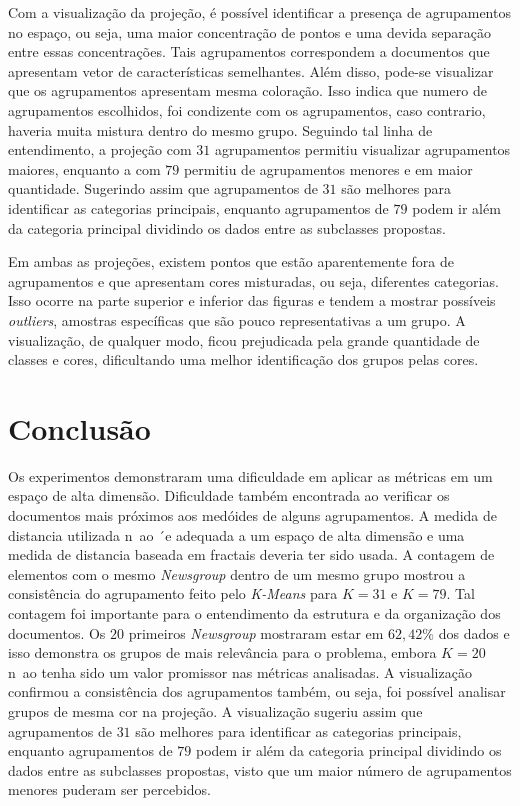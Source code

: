 \documentclass[conference]{IEEEtran}
\begin{document}
Com a visualização da projeção, é possível identificar a presença de agrupamentos no espaço, ou seja, uma maior concentração de pontos e uma devida separação entre essas concentrações. Tais agrupamentos correspondem a documentos que apresentam vetor de características semelhantes. Além disso, pode-se visualizar que os agrupamentos apresentam mesma coloração. Isso indica que numero de agrupamentos escolhidos, foi condizente com os agrupamentos, caso contrario, haveria muita mistura dentro do mesmo grupo. Seguindo tal linha de entendimento, a projeção com $31$ agrupamentos permitiu visualizar agrupamentos maiores, enquanto a com $79$ permitiu de agrupamentos menores e em maior quantidade. Sugerindo assim que agrupamentos de $31$ são melhores para identificar as categorias principais, enquanto agrupamentos de $79$ podem ir além da categoria principal dividindo os dados entre as subclasses propostas.

Em ambas as projeções, existem pontos que estão aparentemente fora de agrupamentos e que apresentam cores misturadas, ou seja, diferentes categorias. Isso ocorre na parte superior e inferior das figuras e tendem a mostrar possíveis \emph{outliers}, amostras específicas que são pouco representativas a um grupo. A visualização, de qualquer modo, ficou prejudicada pela grande quantidade de classes e cores, dificultando uma melhor identificação dos grupos pelas cores.

\section{Conclusão}

Os experimentos demonstraram uma dificuldade em aplicar as métricas em um espaço de alta dimensão. Dificuldade também encontrada ao verificar os documentos mais próximos aos medóides de alguns agrupamentos. A medida de distancia utilizada n~ao ´e adequada a um espaço de alta dimensão e uma medida de distancia baseada em fractais deveria ter sido usada\cite{b1}. A contagem de elementos com o mesmo \emph{Newsgroup} dentro de um mesmo grupo mostrou a consistência do agrupamento feito pelo \emph{K-Means} para $K=31$ e $K=79$. Tal contagem foi importante para o entendimento da estrutura e da organização dos documentos. Os $20$ primeiros \emph{Newsgroup} mostraram estar em $62,42\%$ dos dados e isso demonstra os grupos de mais relevância para o problema, embora $K=20$ n~ao tenha sido um valor promissor nas métricas analisadas. A visualização confirmou a consistência dos agrupamentos também, ou seja, foi possível analisar grupos de mesma cor na projeção. A visualização sugeriu assim que agrupamentos de $31$ são melhores para identificar as categorias principais, enquanto agrupamentos de $79$ podem ir além da categoria principal dividindo os dados entre as subclasses propostas, visto que um maior número de agrupamentos menores puderam ser percebidos.
\end{document}
